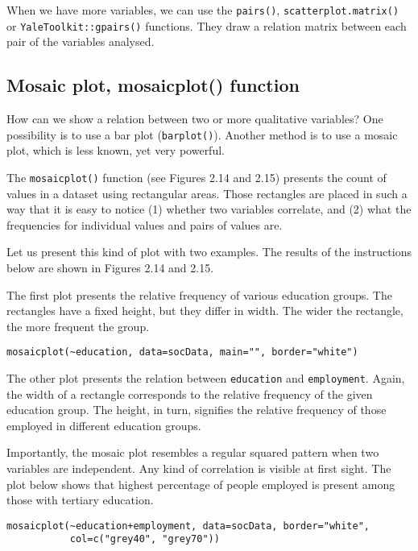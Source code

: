 \documentclass[]{book}
\theoremstyle{definition}
\theoremstyle{definition}
\theoremstyle{definition}
\theoremstyle{remark}
\begin{document}
When we have more variables, we can use the \texttt{pairs()},
\texttt{scatterplot.matrix()} or \texttt{YaleToolkit::gpairs()}
functions. They draw a relation matrix between each pair of the
variables analysed.

\subsection{Mosaic plot, mosaicplot() function}\label{part_246}

How can we show a relation between two or more qualitative variables?
One possibility is to use a bar plot (\texttt{barplot()}). Another
method is to use a mosaic plot, which is less known, yet very powerful.

The \texttt{mosaicplot()} function (see Figures 2.14 and 2.15) presents
the count of values in a dataset using rectangular areas. Those
rectangles are placed in such a way that it is easy to notice (1)
whether two variables correlate, and (2) what the frequencies for
individual values and pairs of values are.

Let us present this kind of plot with two examples. The results of the
instructions below are shown in Figures 2.14 and 2.15.

The first plot presents the relative frequency of various education
groups. The rectangles have a fixed height, but they differ in width.
The wider the rectangle, the more frequent the group.

\begin{verbatim}
mosaicplot(~education, data=socData, main="", border="white")
\end{verbatim}

The other plot presents the relation between \texttt{education} and
\texttt{employment}. Again, the width of a rectangle corresponds to the
relative frequency of the given education group. The height, in turn,
signifies the relative frequency of those employed in different
education groups.

Importantly, the mosaic plot resembles a regular squared pattern when
two variables are independent. Any kind of correlation is visible at
first sight. The plot below shows that highest percentage of people
employed is present among those with tertiary education.

\begin{verbatim}
mosaicplot(~education+employment, data=socData, border="white",
           col=c("grey40", "grey70"))
\end{verbatim}
\end{document}
